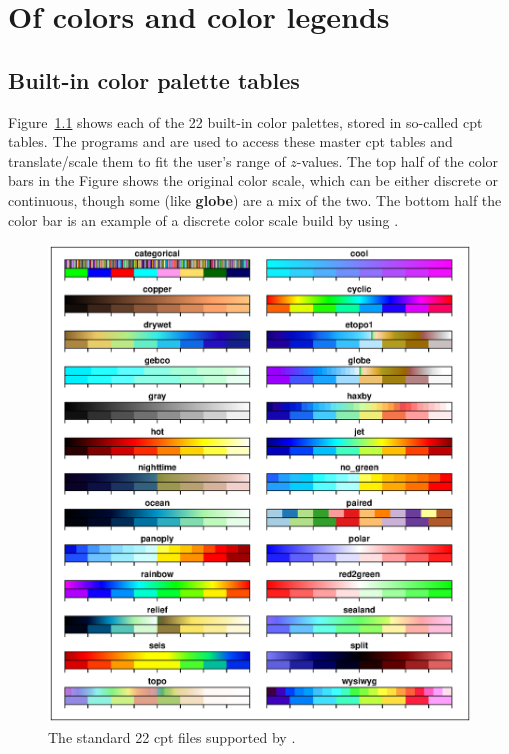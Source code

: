 %
%
\chapter{Of colors and color legends}
\label{app:M}
\section{Built-in color palette tables}
\thispagestyle{headings}

Figure~\ref{fig:GMT_App_M_1} shows each of the 22 built-in color palettes,
stored in so-called cpt tables.
The programs  and  are used to access these master cpt tables
and translate/scale them to fit the user's range of $z$-values.
The top half of the color bars in the Figure shows the original color scale, which can be either discrete or
continuous, though some (like \textbf{globe}) are a mix of the two.
The bottom half the color bar is an example of a discrete color scale build by using
 .

\begin{figure}[h]
\centering
\includegraphics[width=\textwidth]{scripts/GMT_App_M_1}
\caption{The standard 22 cpt files supported by \gmt.}
\label{fig:GMT_App_M_1}
\end{figure}

